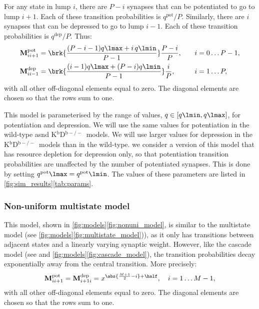 \documentclass[10pt]{article}
\newcommand{\M}{\mathbf{M}}
\newcommand{\pot}{^{\text{pot}}}
\newcommand{\dep}{^{\text{dep}}}
\newcommand{\KO}{K$^\mathrm{b}$D$^{\mathrm{b}-/-}$}
\begin{document}
For any state in lump $i$, there are $P-i$ synapses that can be potentiated to go to lump $i+1$.
Each of these transition probabilities is $q\pot/P$.
Similarly, there are $i$ synapses that can be depressed to go to lump $i-1$.
Each of these transition probabilities is $q\dep/P$.
Thus:
%
\begin{equation}\label{eq:pooledpotdep}
  \begin{aligned}
    \M\pot_{ii+1} &=  \brk{\frac{(P-i-1)q\lmax + i\,q\lmin}{P-1}} \frac{P-i}{P} ,
      \quad& i &= 0 \ldots P-1,\\
    \M\dep_{ii-1} &=  \brk{\frac{(i-1)q\lmax + (P-i)q\lmin}{P-1}} \frac{i}{P} ,
           & i &= 1 \ldots P,
  \end{aligned}
\end{equation}
%
with all other off-diagonal elements equal to zero.
The diagonal elements are chosen so that the rows sum to one.

This model is parameterised by the range of values, $q\in[q\lmin,q\lmax]$, for potentiation and depression.
We will use the same values for potentiation in the wild-type asnd \KO\ models.
We will use larger values for depression in the \KO\ models than in the wild-type.
we consider a version of this model that has resource depletion for depression only, so that potentiation transition probabilities are unaffected by the number of potentiated synapses.
This is done by setting $q\pot\lmax=q\pot\lmin$.
The values of these parameters are listed in \autoref{fig:sim_results}\ref{tab:params}.




\subsubsection{Non-uniform multistate model}\label{sec:nonunimodel}

This model, shown in \autoref{fig:models}\ref{fig:nonuni_model}, is similar to the multistate model (see \autoref{fig:models}\ref{fig:multistate_model})), as it only has transitions between adjacent states and a linearly varying synaptic weight.
However, like the cascade model (see \cite{Fusi2005cascade} and \autoref{fig:models}\ref{fig:cascade_model}), the transition probabilities decay exponentially away from the central transition.
More precisely:
%
\begin{equation}\label{eq:nonunidef}
    \M\pot_{ii+1} = \M\dep_{i+1i} =  x^{\abs{\frac{M+1}{2}-i}+\half},
      \quad i = 1 \ldots M-1,
\end{equation}
%
with all other off-diagonal elements equal to zero.
The diagonal elements are chosen so that the rows sum to one.
\end{document}
